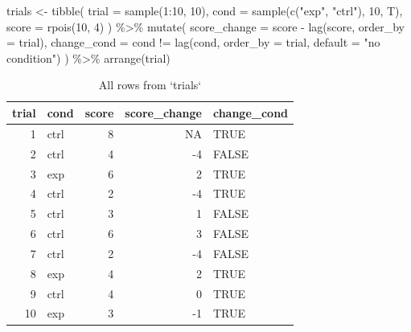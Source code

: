 \documentclass[
  oneside]{book}
\newenvironment{Shaded}{\begin{snugshade}}{\end{snugshade}}
\newcommand{\AttributeTok}[1]{\textcolor[rgb]{0.77,0.63,0.00}{#1}}
\newcommand{\DecValTok}[1]{\textcolor[rgb]{0.00,0.00,0.81}{#1}}
\newcommand{\FunctionTok}[1]{\textcolor[rgb]{0.00,0.00,0.00}{#1}}
\newcommand{\NormalTok}[1]{#1}
\newcommand{\OtherTok}[1]{\textcolor[rgb]{0.56,0.35,0.01}{#1}}
\newcommand{\SpecialCharTok}[1]{\textcolor[rgb]{0.00,0.00,0.00}{#1}}
\newcommand{\StringTok}[1]{\textcolor[rgb]{0.31,0.60,0.02}{#1}}
\begin{document}
\begin{Shaded}
\begin{Highlighting}[]
\NormalTok{trials }\OtherTok{\textless{}{-}} \FunctionTok{tibble}\NormalTok{(}
  \AttributeTok{trial =} \FunctionTok{sample}\NormalTok{(}\DecValTok{1}\SpecialCharTok{:}\DecValTok{10}\NormalTok{, }\DecValTok{10}\NormalTok{),}
  \AttributeTok{cond =} \FunctionTok{sample}\NormalTok{(}\FunctionTok{c}\NormalTok{(}\StringTok{"exp"}\NormalTok{, }\StringTok{"ctrl"}\NormalTok{), }\DecValTok{10}\NormalTok{, T),}
  \AttributeTok{score =} \FunctionTok{rpois}\NormalTok{(}\DecValTok{10}\NormalTok{, }\DecValTok{4}\NormalTok{)}
\NormalTok{) }\SpecialCharTok{\%\textgreater{}\%}
  \FunctionTok{mutate}\NormalTok{(}
    \AttributeTok{score\_change =}\NormalTok{ score }\SpecialCharTok{{-}} \FunctionTok{lag}\NormalTok{(score, }\AttributeTok{order\_by =}\NormalTok{ trial),}
    \AttributeTok{change\_cond =}\NormalTok{ cond }\SpecialCharTok{!=} \FunctionTok{lag}\NormalTok{(cond, }\AttributeTok{order\_by =}\NormalTok{ trial, }
                              \AttributeTok{default =} \StringTok{"no condition"}\NormalTok{)}
\NormalTok{  ) }\SpecialCharTok{\%\textgreater{}\%}
  \FunctionTok{arrange}\NormalTok{(trial)}
\end{Highlighting}
\end{Shaded}

\begin{table}

\caption{\label{tab:offset-adv}All rows from `trials`}
\centering
\begin{tabular}[t]{r|l|r|r|l}
\hline
trial & cond & score & score\_change & change\_cond\\
\hline
1 & ctrl & 8 & NA & TRUE\\
\hline
2 & ctrl & 4 & -4 & FALSE\\
\hline
3 & exp & 6 & 2 & TRUE\\
\hline
4 & ctrl & 2 & -4 & TRUE\\
\hline
5 & ctrl & 3 & 1 & FALSE\\
\hline
6 & ctrl & 6 & 3 & FALSE\\
\hline
7 & ctrl & 2 & -4 & FALSE\\
\hline
8 & exp & 4 & 2 & TRUE\\
\hline
9 & ctrl & 4 & 0 & TRUE\\
\hline
10 & exp & 3 & -1 & TRUE\\
\hline
\end{tabular}
\end{table}
\end{document}
